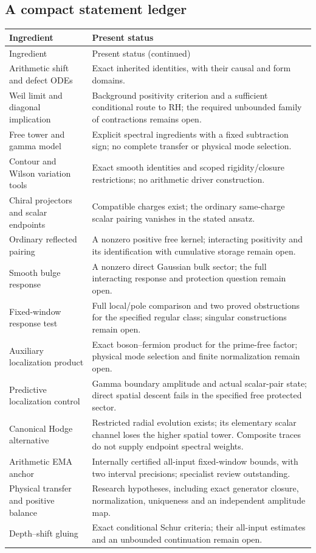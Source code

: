 \clearpage
\subsection{A compact statement ledger}

\renewcommand{\arraystretch}{1.13}
\begin{longtable}{@{}p{}p{}@{}}
\toprule
Ingredient & Present status\\
\midrule
\endfirsthead
\toprule
Ingredient & Present status (continued)\\
\midrule
\endhead
\bottomrule
\endfoot
Arithmetic shift and defect ODEs &
Exact inherited identities, with their causal and form domains.\\
Weil limit and diagonal implication &
Background positivity criterion and a sufficient conditional route
to RH; the required unbounded family of contractions remains open.\\
Free tower and gamma model &
Explicit spectral ingredients with a fixed subtraction sign;
no complete transfer or physical mode selection.\\
Contour and Wilson variation tools &
Exact smooth identities and scoped rigidity/closure restrictions;
no arithmetic driver construction.\\
Chiral projectors and scalar endpoints &
Compatible charges exist; the ordinary same-charge scalar
pairing vanishes in the stated ansatz.\\
Ordinary reflected pairing &
A nonzero positive free kernel; interacting positivity and its
identification with cumulative storage remain open.\\
Smooth bulge response &
A nonzero direct Gaussian bulk sector; the full interacting
response and protection question remain open.\\
Fixed-window response test &
Full local/pole comparison and two proved obstructions for the
specified regular class; singular constructions remain open.\\
Auxiliary localization product &
Exact boson--fermion product for the prime-free factor;
physical mode selection and finite normalization remain open.\\
Predictive localization control &
Gamma boundary amplitude and actual scalar-pair state; direct
spatial descent fails in the specified free protected sector.\\
Canonical Hodge alternative &
Restricted radial evolution exists; its elementary scalar channel
loses the higher spatial tower. Composite traces do not supply
endpoint spectral weights.\\
Arithmetic EMA anchor &
Internally certified all-input fixed-window bounds, with two
interval precisions; specialist review outstanding.\\
Physical transfer and positive balance &
Research hypotheses, including exact generator closure,
normalization, uniqueness and an independent amplitude map.\\
Depth--shift gluing &
Exact conditional Schur criteria; their all-input estimates
and an unbounded continuation remain open.\\
\end{longtable}
\renewcommand{\arraystretch}{1}

